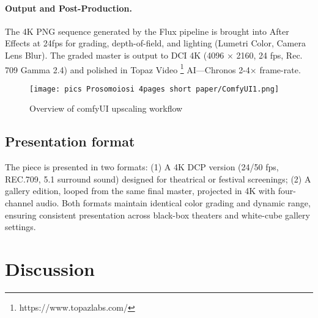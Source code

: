 \documentclass[sigconf,nonacm]{acmart}
\begin{document}

\paragraph{Output and Post-Production.}
The 4K PNG sequence generated by the Flux pipeline is brought into After Effects at 24fps for grading, depth-of-field, and lighting (Lumetri Color, Camera Lens Blur). The graded master is output to DCI 4K (4096 × 2160, 24 fps, Rec. 709 Gamma 2.4) and polished in Topaz Video \footnote{https://www.topazlabs.com/} AI—Chronos 2-4× frame-rate.

\begin{figure}
    \centering
    \texttt{[image: pics Prosomoiosi 4pages short paper/ComfyUI1.png]}
    \caption{Overview of comfyUI upscaling workflow}
    \label{fig:enter-label}
\end{figure}

\subsection{Presentation format}
The piece is presented in two formats:
(1) A 4K DCP version (24/50 fps, REC.709, 5.1 surround sound) designed for theatrical or festival screenings;
(2) A gallery edition, looped from the same final master, projected in 4K with four-channel audio. Both formats maintain identical color grading and dynamic range, ensuring consistent presentation across black-box theaters and white-cube gallery settings.


\section{Discussion}
\end{document}
